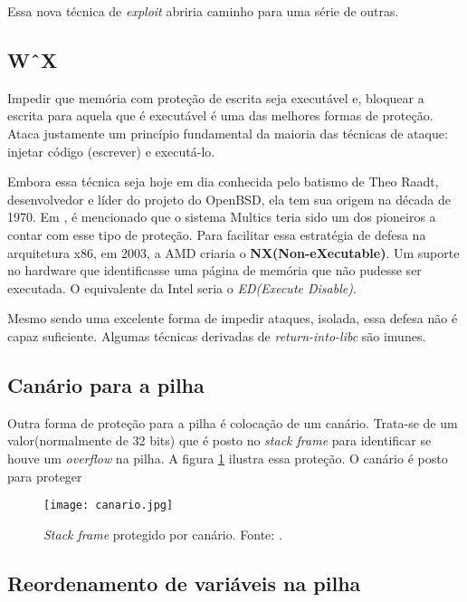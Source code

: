			
			Essa nova técnica de \textsl{exploit} abriria caminho para uma série de outras.
		

		\subsection{W\^\ X}
			Impedir que memória com proteção de escrita seja executável e, bloquear a escrita
			para aquela que é executável é uma das melhores formas de proteção.
			Ataca justamente um princípio fundamental da maioria das técnicas de ataque: injetar código
			(escrever) e executá-lo.	
			

			Embora essa técnica seja hoje em dia conhecida pelo batismo de Theo Raadt, desenvolvedor
			e líder do projeto do OpenBSD, ela tem sua origem na década de 1970. Em \cite{Anley2007},
			é mencionado que o sistema Multics teria sido um dos pioneiros a contar com esse tipo de
			proteção. Para facilitar essa estratégia de defesa na arquitetura x86, em 2003, a AMD
			criaria o \textbf{NX(Non-eXecutable)}. Um suporte no hardware que identificasse uma página de
			memória que não pudesse ser executada. O equivalente da Intel seria o \textsl{ED(Execute Disable)}.


			Mesmo sendo uma excelente forma de impedir ataques, isolada, essa defesa não é capaz
			suficiente. Algumas técnicas derivadas de \textsl{return-into-libc} são imunes.


		\subsection{Canário para a pilha}
			Outra forma de proteção para a pilha é colocação de um canário.
			Trata-se de um valor(normalmente de 32 bits) que é posto no \textsl{stack frame}
			para identificar se houve um \textsl{overflow} na pilha.
			A figura \ref{fig:canario} ilustra essa proteção. O canário é posto para proteger
			
			\begin{figure}
				\begin{center}
					\texttt{[image: canario.jpg]}
					\caption{\textsl{Stack frame} protegido por canário. Fonte: \cite{Furlan2005}.}
					\label{fig:canario}
				\end{center}
			\end{figure}

		\subsection{Reordenamento de variáveis na pilha}

